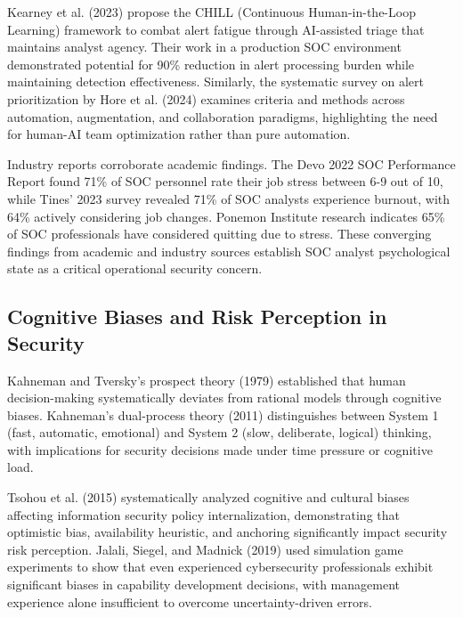 \documentclass[11pt, a4paper]{article}
\begin{document}
Kearney et al. (2023)\cite{kearney2023combating} propose the CHILL (Continuous Human-in-the-Loop Learning) framework to combat alert fatigue through AI-assisted triage that maintains analyst agency. Their work in a production SOC environment demonstrated potential for 90\% reduction in alert processing burden while maintaining detection effectiveness. Similarly, the systematic survey on alert prioritization by Hore et al. (2024)\cite{hore2024alert} examines criteria and methods across automation, augmentation, and collaboration paradigms, highlighting the need for human-AI team optimization rather than pure automation.

Industry reports corroborate academic findings. The Devo 2022 SOC Performance Report found 71\% of SOC personnel rate their job stress between 6-9 out of 10\cite{devo2022soc}, while Tines' 2023 survey revealed 71\% of SOC analysts experience burnout, with 64\% actively considering job changes\cite{tines2023burnout}. Ponemon Institute research indicates 65\% of SOC professionals have considered quitting due to stress\cite{ponemon2021soc}. These converging findings from academic and industry sources establish SOC analyst psychological state as a critical operational security concern.

\subsection{Cognitive Biases and Risk Perception in Security}

Kahneman and Tversky's prospect theory (1979)\cite{kahneman1979prospect} established that human decision-making systematically deviates from rational models through cognitive biases. Kahneman's dual-process theory (2011)\cite{kahneman2011thinking} distinguishes between System 1 (fast, automatic, emotional) and System 2 (slow, deliberate, logical) thinking, with implications for security decisions made under time pressure or cognitive load.

Tsohou et al. (2015)\cite{tsohou2015analyzing} systematically analyzed cognitive and cultural biases affecting information security policy internalization, demonstrating that optimistic bias, availability heuristic, and anchoring significantly impact security risk perception. Jalali, Siegel, and Madnick (2019)\cite{jalali2019decision} used simulation game experiments to show that even experienced cybersecurity professionals exhibit significant biases in capability development decisions, with management experience alone insufficient to overcome uncertainty-driven errors.
\end{document}
